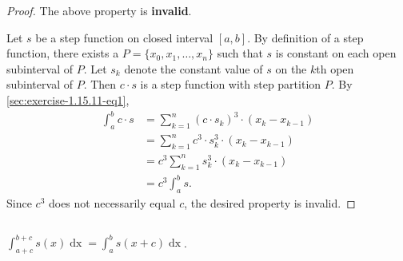 \documentclass{report}
\begin{document}
\begin{proof}

  The above property is \textbf{invalid}.

  \vspace{6pt}

  Let $s$ be a step function on closed interval $[a, b]$.
  By definition of a step function, there exists a 
    $P = \{x_0, x_1, \ldots, x_n\}$ such that $s$ is constant on each open
    subinterval of $P$.
  Let $s_k$ denote the constant value of $s$ on the $k$th open subinterval of
    $P$.
  Then $c \cdot s$ is a step function with step partition $P$.
  By \eqref{sec:exercise-1.15.11-eq1},
    \begin{align*}
      \int_a^b c \cdot s
        & = \sum_{k=1}^n (c \cdot s_k)^3 \cdot (x_k - x_{k-1}) \\
        & = \sum_{k=1}^n c^3 \cdot s_k^3 \cdot (x_k - x_{k-1}) \\
        & = c^3 \sum_{k=1}^n s_k^3 \cdot (x_k - x_{k-1}) \\
        & = c^3 \int_a^b s.
    \end{align*}
  Since $c^3$ does not necessarily equal $c$, the desired property is invalid.

\end{proof}

\subsection{}%
\label{sub:exercise-1.15.11d}

$\int_{a+c}^{b+c} s(x) \mathop{dx} = \int_a^b s(x + c) \mathop{dx}$.

\end{document}
